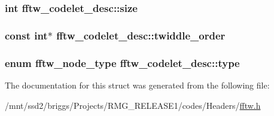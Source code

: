 \hypertarget{structfftw__codelet__desc_a195e2487dcd74ffc44f888612d25ac94}{
\subsubsection[{size}]{\setlength{\rightskip}{0pt plus 5cm}int fftw\-\_\-codelet\-\_\-desc\-::size}}\label{structfftw__codelet__desc_a195e2487dcd74ffc44f888612d25ac94}
\hypertarget{structfftw__codelet__desc_a655dd809b3b9a6f6c0676879f08b05a1}{
\subsubsection[{twiddle\-\_\-order}]{\setlength{\rightskip}{0pt plus 5cm}const int$\ast$ fftw\-\_\-codelet\-\_\-desc\-::twiddle\-\_\-order}}\label{structfftw__codelet__desc_a655dd809b3b9a6f6c0676879f08b05a1}
\hypertarget{structfftw__codelet__desc_a70eb46f55828f3b899272641c9d76949}{
\subsubsection[{type}]{\setlength{\rightskip}{0pt plus 5cm}enum {\bf fftw\-\_\-node\-\_\-type} fftw\-\_\-codelet\-\_\-desc\-::type}}\label{structfftw__codelet__desc_a70eb46f55828f3b899272641c9d76949}


The documentation for this struct was generated from the following file\-:\begin{DoxyCompactItemize}
\item 
/mnt/ssd2/briggs/\-Projects/\-R\-M\-G\-\_\-\-R\-E\-L\-E\-A\-S\-E1/codes/\-Headers/\hyperlink{fftw_8h}{fftw.\-h}\end{DoxyCompactItemize}
